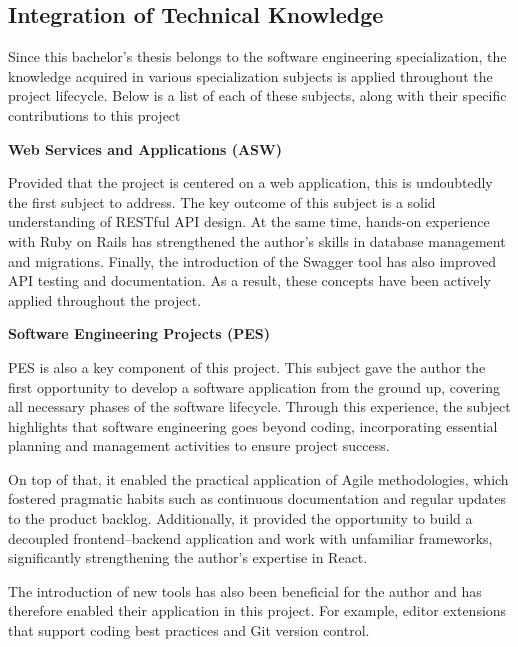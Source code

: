 \subsection{Integration of Technical Knowledge}
\label{sec:integration-of-technical-knowledge}

Since this bachelor's thesis belongs to the software engineering specialization, the knowledge acquired in various specialization subjects is applied throughout the project lifecycle. Below is a list of each of these subjects, along with their specific contributions to this project

\vspace{0.2cm}
\textbf{Web Services and Applications (ASW)}
\vspace{-0.1cm}

Provided that the project is centered on a web application, this is undoubtedly the first subject to address. The key outcome of this subject is a solid understanding of RESTful API design. At the same time, hands-on experience with Ruby on Rails has strengthened the author's skills in database management and migrations. Finally, the introduction of the Swagger tool has also improved API testing and documentation. As a result, these concepts have been actively applied throughout the project.

\vspace{0.2cm}
\textbf{Software Engineering Projects (PES)}
\vspace{-0.1cm}

PES is also a key component of this project. This subject gave the author the first opportunity to develop a software application from the ground up, covering all necessary phases of the software lifecycle. Through this experience, the subject highlights that software engineering goes beyond coding, incorporating essential planning and management activities to ensure project success.

On top of that, it enabled the practical application of Agile methodologies, which fostered pragmatic habits such as continuous documentation and regular updates to the product backlog. Additionally, it provided the opportunity to build a decoupled frontend–backend application and work with unfamiliar frameworks, significantly strengthening the author's expertise in React. 

The introduction of new tools has also been beneficial for the author and has therefore enabled their application in this project. For example, editor extensions that support coding best practices and Git version control.

